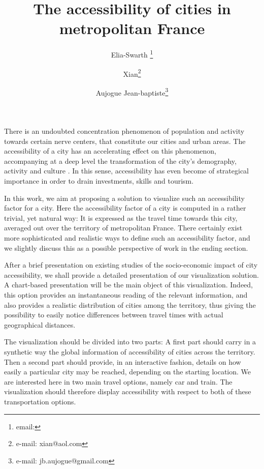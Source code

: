 \documentclass{vgtc}                          %
\title{The accessibility of cities in metropolitan France}
\author{Elia-Swarth \thanks{email:}\\ %
\and Xian\thanks{e-mail: xian@aol.com}\\ %
\and Aujogue Jean-baptiste\thanks{e-mail: jb.aujogue@gmail.com}} %
\begin{document}


\maketitle
There is an undoubted concentration phenomenon of population and activity towards certain nerve centers, that constitute our cities and urban areas. The accessibility of a city has an accelerating effect on this phenomenon, accompanying at a deep level the transformation of the city's demography, activity and culture \cite{RePEc:mtp:titles:0262561476}. In this sense, accessibility has even become of strategical importance in order to drain investments, skills and tourism.

\vspace{0.3cm}

 In this work, we aim at proposing a solution to visualize such an accessibility factor for a city. Here the accessibility factor of a city is computed in a rather trivial, yet natural way: It is expressed as the travel time towards this city, averaged out over the territory of metropolitan France. There certainly exist more sophisticated and realistic ways to define such an accessibility factor, and we slightly discuss this as a possible perspective of work in the ending section.

\vspace{0.3cm}

After a brief presentation on existing studies of the socio-economic impact of city accessibility, we shall provide a detailed presentation of our visualization solution. A chart-based presentation will be the main object of this visualization. Indeed, this option provides an instantaneous reading of the relevant information, and also provides a realistic distribution of cities among the territory, thus giving the possibility to easily notice differences between travel times with actual geographical distances.

\vspace{0.3cm}

The visualization should be divided into two parts: A first part should carry in a synthetic way the global information of accessibility of cities across the territory. Then a second part should provide, in an interactive fashion, details on how easily a particular city may be reached, depending on the starting location. We are interested here in two main travel options, namely car and train. The visualization should therefore display accessibility with respect to both of these transportation options.
\end{document}
